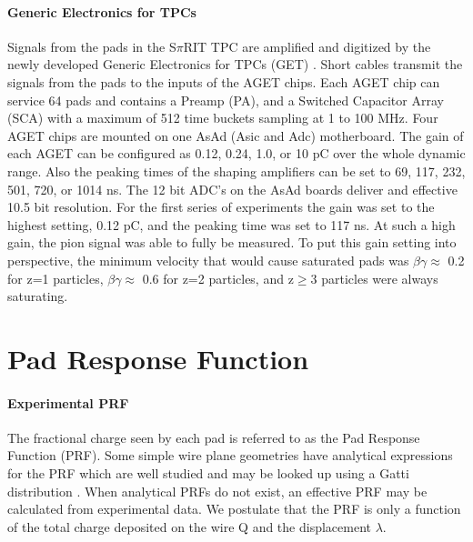 \documentclass[review]{elsarticle}
\begin{document}
\paragraph{Generic Electronics for TPCs}
Signals from the pads in the S$\pi$RIT TPC are amplified and digitized by the newly developed Generic Electronics for TPCs (GET) \cite{get}.  Short cables transmit the signals from the pads to the inputs of the AGET chips. Each AGET chip can service 64 pads and contains a Preamp (PA), and a Switched Capacitor Array (SCA) with a maximum of 512 time buckets sampling at 1 to 100 MHz. Four AGET chips are mounted on one AsAd (Asic and Adc) motherboard. The gain of each AGET can be configured as 0.12, 0.24, 1.0, or 10 pC over the whole dynamic range. Also the peaking times of the shaping amplifiers can be set to 69, 117, 232, 501, 720, or 1014 ns. The 12 bit ADC's on the AsAd boards deliver and effective 10.5 bit resolution. For the first series of experiments the gain was set to the highest setting, 0.12 pC, and the peaking time was set to 117 ns. At such a high gain, the pion signal was able to fully be measured. To put this gain setting into perspective, the minimum velocity that would cause saturated pads was $\beta\gamma\approx$ 0.2 for z=1 particles, $\beta\gamma\approx$ 0.6 for z=2 particles, and z$\geq$3 particles were always saturating. 

\section{Pad Response Function}
\paragraph{Experimental PRF}
The fractional charge seen by each pad is referred to as the Pad Response Function (PRF). Some simple wire plane geometries have analytical expressions for the PRF which are well studied and may be looked up using a Gatti distribution \cite{blumrol}. When analytical PRFs do not exist, an effective PRF may be calculated from experimental data. We postulate that the PRF is only a function of the total charge deposited on the wire Q and the displacement $\lambda$.
\end{document}
